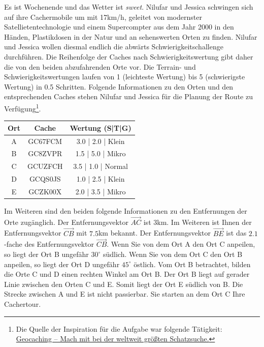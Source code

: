 \documentclass[a4paper, 9pt]{scrartcl}\usepackage[]{graphicx}\usepackage[]{xcolor}
\begin{document}
Es ist Wochenende und das Wetter ist \textit{sweet}. Nilufar und Jessica schwingen sich auf ihre Cachermobile um mit 17km/h, geleitet von modernster Satellietentechnologie und einem Supercompter aus dem Jahr 2000 in den Händen, Plastikdosen in der Natur und an sehenswerten Orten zu finden. Nilufar und Jessica wollen diesmal endlich die abwärts Schwierigkeitschallenge durchführen. Die Reihenfolge der Caches nach Schwierigkeitswertung gibt daher die von den beiden abzufahrenden Orte vor. Die Terrain- und Schwierigkeitswertungen laufen von 1 (leichteste Wertung) bis 5 (schwierigste Wertung) in 0.5 Schritten. Folgende Informationen zu den Orten und den entsprechenden Caches stehen Nilufar und Jessica für die Planung der Route zu Verfügung\footnote{Die Quelle der Inspiration für die Aufgabe war folgende Tätigkeit: \href{https://www.geocaching.com/play}{Geocaching -- Mach mit bei der weltweit größten Schatzsuche.}}.

\begin{center}
  \begin{tabular}{ ccc }
    \toprule
    Ort & Cache & Wertung (S|T|G) \\
    \midrule
    A & GC67FCM & 3.0 | 2.0 | Klein \\
    B & GC8ZVPR & 1.5 | 5.0 | Mikro \\ 
    C & GCUZFCH & 3.5 | 1.0 | Normal \\ 
    D & GCQS0JS & 1.0 | 2.5 | Klein \\ 
    E & GCZK00X & 2.0 | 3.5 | Mikro \\     
 \bottomrule
\end{tabular}
\end{center}

Im Weiteren sind den beiden folgende Informationen zu den Entfernungen der Orte zugänglich. Der Entfernungsvektor $\overrightarrow{AC}$ ist $3$km. Im Weiteren ist Ihnen der Entfernungsvektor $\overrightarrow{CB}$ mit $7.5$km bekannt. Der Entfernungsvektor $\overrightarrow{BE}$ ist das $2.1$-fache des Entfernungsvektor $\overrightarrow{CB}$. Wenn Sie von dem Ort A den Ort C anpeilen, so liegt der Ort B ungefähr $30^\circ$ südlich. Wenn Sie von dem Ort C den Ort B anpeilen, so liegt der Ort D ungefähr $45^\circ$ östlich. Vom Ort B betrachtet, bilden die Orte C und D einen rechten Winkel am Ort B. Der Ort B liegt auf gerader Linie zwischen den Orten C und E. Somit liegt der Ort E südlich von B. Die Strecke zwischen A und E ist nicht passierbar. Sie starten an dem Ort C Ihre Cachertour. \\
\end{document}

